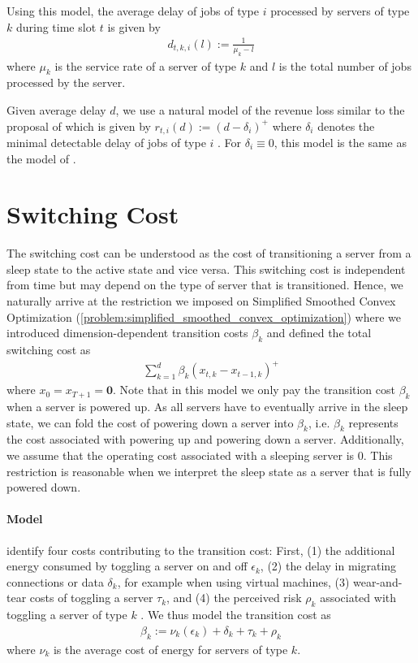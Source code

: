 Using this model, the average delay of jobs of type $i$ processed by servers of type $k$ during time slot $t$ is given by \begin{align*}
    d_{t,k,i}(l) := \frac{1}{\mu_k - l}
\end{align*} where $\mu_k$ is the service rate of a server of type $k$ and $l$ is the total number of jobs processed by the server.

Given average delay $d$, we use a natural model of the revenue loss similar to the proposal of \citeauthor*{Lin2011} which is given by $r_{t,i}(d) := (d - \delta_i)^+$ where $\delta_i$ denotes the minimal detectable delay of jobs of type $i$ \cite{Lin2011}. For $\delta_i \equiv 0$, this model is the same as the model of \cite{Lin2012}.

\section{Switching Cost}

The switching cost can be understood as the cost of transitioning a server from a sleep state to the active state and vice versa. This switching cost is independent from time but may depend on the type of server that is transitioned. Hence, we naturally arrive at the restriction we imposed on Simplified Smoothed Convex Optimization (\autoref{problem:simplified_smoothed_convex_optimization}) where we introduced dimension-dependent transition costs $\beta_k$ and defined the total switching cost as \begin{align*}
    \sum_{k=1}^d \beta_k (x_{t,k} - x_{t-1,k})^+
\end{align*} where $x_0 = x_{T+1} = \mathbf{0}$. Note that in this model we only pay the transition cost $\beta_k$ when a server is powered up. As all servers have to eventually arrive in the sleep state, we can fold the cost of powering down a server into $\beta_k$, i.e. $\beta_k$ represents the cost associated with powering up and powering down a server. Additionally, we assume that the operating cost associated with a sleeping server is $0$. This restriction is reasonable when we interpret the sleep state as a server that is fully powered down.

\paragraph{Model} \citeauthor*{Lin2011} identify four costs contributing to the transition cost: First, (1) the additional energy consumed by toggling a server on and off $\epsilon_k$, (2) the delay in migrating connections or data $\delta_k$, for example when using virtual machines, (3) wear-and-tear costs of toggling a server $\tau_k$, and (4) the perceived risk $\rho_k$ associated with toggling a server of type $k$ \cite{Lin2011}. We thus model the transition cost as \begin{align*}
    \beta_k := \nu_k(\epsilon_k) + \delta_k + \tau_k + \rho_k
\end{align*} where $\nu_k$ is the average cost of energy for servers of type $k$.

